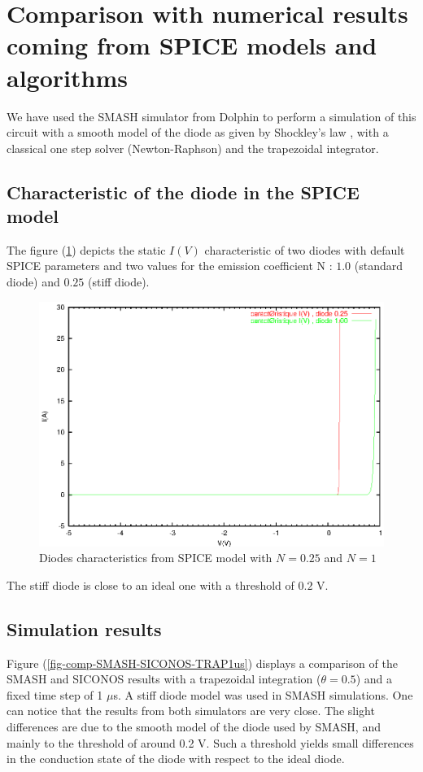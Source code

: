 \documentclass[10pt]{article}
\begin{document}
\newpage
\section{Comparison with numerical results coming from SPICE models and algorithms}
We have used the SMASH simulator from Dolphin to perform a simulation of this circuit with a smooth model
of the diode as given by Shockley's law , with a classical one step solver (Newton-Raphson) and the trapezoidal integrator.

\subsection{Characteristic of the diode in the SPICE model}
The figure (\ref{fig-carac-diode}) depicts the static $I(V)$ characteristic of two diodes with default SPICE parameters
and two values for the emission coefficient N : $1.0$ (standard diode) and $0.25$ (stiff diode).

\begin{figure}[hbt]
\begin{center}
\includegraphics[width=12cm]{caracdiode.eps}
\end{center}
\caption{Diodes characteristics from SPICE model with $N=0.25$ and $N=1$}
\label{fig-carac-diode}
\end{figure}
 
The stiff diode is close to an ideal one with a threshold of $0.2$ V.

\subsection{Simulation results}
Figure (\ref{fig-comp-SMASH-SICONOS-TRAP1us}) displays a comparison of the SMASH and SICONOS results with
a trapezoidal integration ($\theta = 0.5$) and a fixed time step of 1 $\mu$s. A stiff diode model was used in SMASH simulations.
One can notice that the results from both simulators are very close. The slight differences are due to the smooth 
model of the diode used by SMASH, and mainly to the threshold of around 0.2 V. Such a threshold
yields small differences in the conduction state of the diode with respect to the ideal diode.
\end{document}
